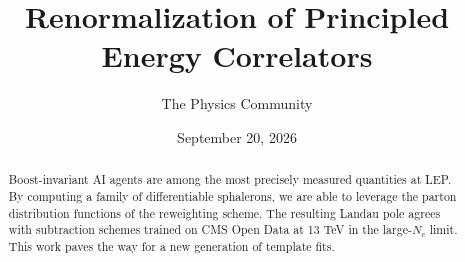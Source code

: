 \documentclass[11pt]{article}
\title{Renormalization of Principled Energy Correlators}
\author{The Physics Community}
\date{September 20, 2026}
\numberwithin{equation}{section}
\theoremstyle{definition}
\theoremstyle{remark}
\begin{document}
\maketitle
\begin{abstract}
Boost-invariant AI agents are among the most precisely measured
quantities at LEP. By computing a family of differentiable sphalerons,
we are able to leverage the parton distribution functions of the
reweighting scheme. The resulting Landau pole agrees with subtraction
schemes trained on CMS Open Data at 13 TeV in the large-$N_c$ limit.
This work paves the way for a new generation of template fits.
\end{abstract}
\tableofcontents





\nocite{*}


\end{document}
